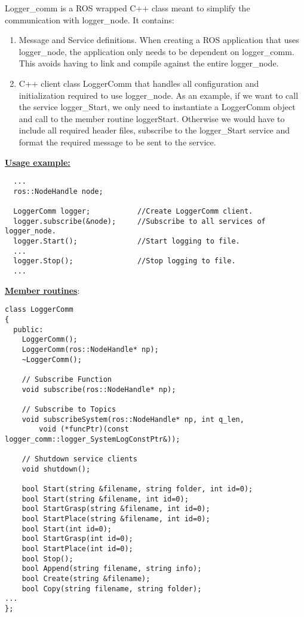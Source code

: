 \documentclass[letterpaper,notitlepage,11pt]{article}
\begin{document}
\noindent Logger\_comm is a ROS wrapped C++ class meant to simplify the
communication with logger\_node. It contains:

\begin{enumerate}
\item Message and Service definitions. When creating a ROS application
  that uses logger\_node, the application only needs to be dependent
  on logger\_comm. This avoids having to link and compile against the
  entire logger\_node.
\item C++ client class LoggerComm that handles all configuration and
  initialization required to use logger\_node. As an example, if we
  want to call the service logger\_Start, we only need to instantiate
  a LoggerComm object and call to the member routine
  loggerStart. Otherwise we would have to include all required header
  files, subscribe to the logger\_Start service and format the
  required message to be sent to the service.
\end{enumerate}

\textbf{\underline{Usage example:}}

\begin{verbatim}
  ...
  ros::NodeHandle node;
 
  LoggerComm logger;           //Create LoggerComm client.
  logger.subscribe(&node);     //Subscribe to all services of logger_node.
  logger.Start();              //Start logging to file.
  ...
  logger.Stop();               //Stop logging to file.
  ...
\end{verbatim}


\textbf{\underline{Member routines}}:

\begin{verbatim}
class LoggerComm
{
  public:
    LoggerComm();
    LoggerComm(ros::NodeHandle* np);
    ~LoggerComm();

    // Subscribe Function
    void subscribe(ros::NodeHandle* np);

    // Subscribe to Topics
    void subscribeSystem(ros::NodeHandle* np, int q_len, 
        void (*funcPtr)(const logger_comm::logger_SystemLogConstPtr&));

    // Shutdown service clients
    void shutdown();

    bool Start(string &filename, string folder, int id=0);
    bool Start(string &filename, int id=0);
    bool StartGrasp(string &filename, int id=0);
    bool StartPlace(string &filename, int id=0);
    bool Start(int id=0);
    bool StartGrasp(int id=0);
    bool StartPlace(int id=0);
    bool Stop();
    bool Append(string filename, string info);
    bool Create(string &filename);
    bool Copy(string filename, string folder);
...
};
\end{verbatim}


%

\end{document}
